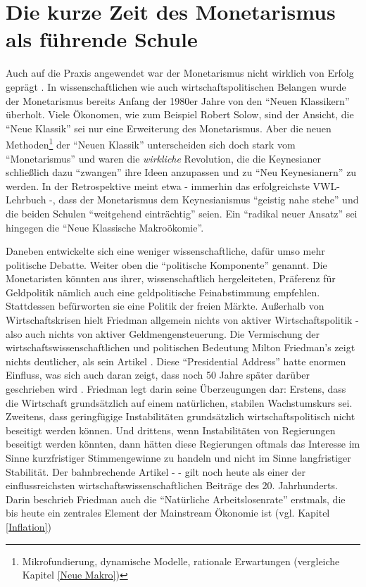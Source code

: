 \section{Die kurze Zeit des Monetarismus als führende Schule}

Auch auf die Praxis angewendet war der Monetarismus nicht wirklich von Erfolg geprägt \parencite[S. 709]{Samuelson1998}. In wissenschaftlichen wie auch wirtschaftspolitischen Belangen wurde der Monetarismus bereits Anfang der 1980er Jahre von den "`Neuen Klassikern"' überholt. Viele Ökonomen, wie zum Beispiel Robert Solow, sind der Ansicht, die "`Neue Klassik"' sei nur eine Erweiterung des Monetarismus\parencite[S.342]{Warsh}. Aber die neuen Methoden\footnote{Mikrofundierung, dynamische Modelle, rationale Erwartungen (vergleiche Kapitel \ref{Neue Makro})} der "`Neuen Klassik"' unterscheiden sich doch stark vom "`Monetarismus"' und waren die \textit{wirkliche} Revolution, die die Keynesianer schließlich dazu "`zwangen"' ihre Ideen anzupassen und zu "`Neu Keynesianern"' zu werden. In der Retrospektive meint etwa \textcite[S. 697]{Samuelson1998} - immerhin das erfolgreichste VWL-Lehrbuch -, dass der Monetarismus dem Keynesianismus "`geistig nahe stehe"' und die beiden Schulen "`weitgehend einträchtig"' \parencite[S. 702]{Samuelson1998} seien. Ein "`radikal neuer Ansatz"'\parencite[S. 704]{Samuelson1998} sei hingegen die "`Neue Klassische Makroökomie"'.





Daneben entwickelte sich eine weniger wissenschaftliche, dafür umso mehr politische Debatte. Weiter oben die "`politische Komponente"' genannt. Die Monetaristen könnten aus ihrer, wissenschaftlich hergeleiteten, Präferenz für Geldpolitik nämlich auch eine geldpolitische Feinabstimmung empfehlen. Stattdessen befürworten sie eine Politik der freien Märkte. Außerhalb von Wirtschaftskrisen hielt Friedman allgemein nichts von aktiver Wirtschaftspolitik - also auch nichts von aktiver Geldmengensteuerung. Die Vermischung der wirtschaftswissenschaftlichen und politischen Bedeutung Milton Friedman's zeigt nichts deutlicher, als sein Artikel \textcite{Friedman1968}. Diese "`Presidential Address"' hatte enormen Einfluss, was sich auch daran zeigt, dass noch 50 Jahre später darüber geschrieben wird \parencite{Mankiw2018}. Friedman legt darin seine Überzeugungen dar: Erstens, dass die Wirtschaft grundsätzlich auf einem natürlichen, stabilen Wachstumskurs sei. Zweitens, dass geringfügige Instabilitäten grundsätzlich wirtschaftspolitisch nicht beseitigt werden können. Und drittens, wenn Instabilitäten von Regierungen beseitigt werden könnten, dann hätten diese Regierungen oftmals das Interesse im Sinne kurzfristiger Stimmengewinne zu handeln und nicht im Sinne langfristiger Stabilität. Der bahnbrechende Artikel - \textcite{Friedman1968} - gilt noch heute als einer der einflussreichsten wirtschaftswissenschaftlichen Beiträge des 20. Jahrhunderts. Darin beschrieb Friedman auch die "`Natürliche Arbeitslosenrate"' erstmals, die bis heute ein zentrales Element der Mainstream Ökonomie ist (vgl. Kapitel \ref{Inflation})

